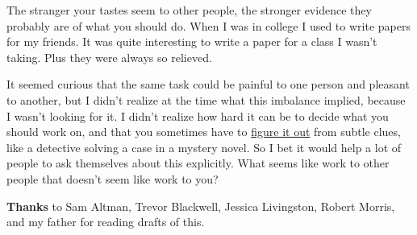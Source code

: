 The stranger your tastes seem to
                  other people, the stronger evidence they probably are of what
                  you should do. When I was in college I used to write papers
                  for my friends. It was quite interesting to write a paper for
                  a class I wasn't taking. Plus they were always so relieved.

It
                  seemed curious that the same task could be painful to one
                  person and pleasant to another, but I didn't realize at the
                  time what this imbalance implied, because I wasn't looking for
                  it. I didn't realize how hard it can be to decide what you
                  should work on, and that you sometimes have to
                  \href{http://www.paulgraham.com/love.html}{figure it out} from subtle clues, like
                  a detective solving a case in a mystery novel. So I bet it
                  would help a lot of people to ask themselves about this
                  explicitly. What seems like work to other people that doesn't
                  seem like work to you?






                  \textbf{Thanks} to Sam Altman, Trevor Blackwell, Jessica
                  Livingston, Robert Morris, and my father for reading drafts of
                  this.


              
            
          
